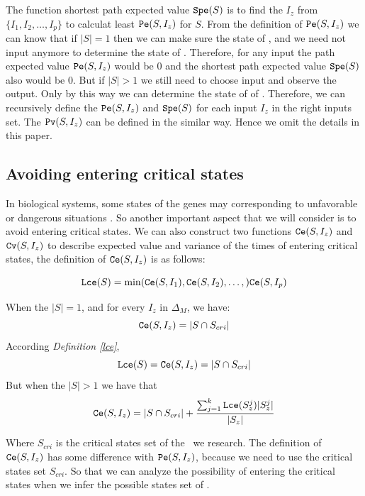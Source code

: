 The function shortest path  expected value ${\tt Spe}(S)$ is to find the $I_z$ from $\{I_1,I_2,\ldots, I_p\}$ to calculat least ${\tt Pe}(S, I_z)$ for $S$. From the definition of ${\tt Pe}(S, I_z)$ we can know that if $|S|=1$ then we can make sure the state of \BCNs, and we need not input anymore to determine the state of \BCNs. Therefore, for any input the path expected value ${\tt Pe}(S, I_z)$ would be $0$ and the shortest path expected value ${\tt Spe}(S)$ also would be $0$. But if $|S|>1$ we still need to choose input and observe the output. Only by this way we can determine the state of of \BCNs. Therefore,  we can recursively define the ${\tt Pe}(S, I_z)$ and ${\tt Spe}(S)$ for each input $I_z$ in the right inputs set.  The ${\tt Pv}(S, I_z)$ can be defined in the similar way. Hence we omit the details in this paper. 

\subsection{Avoiding entering critical states}
In biological systems, some states of the genes may corresponding to unfavorable or dangerous situations \cite{Li2014Controllability}. So another important aspect that we will consider is to avoid entering critical states. We can also construct two functions $\Ce(S, I_z)$ and ${\tt Cv}(S, I_z)$ to describe expected value and variance of the times of entering critical states, the definition of $\Ce(S, I_z)$ is as follows:\\
\begin{definition}[$\Lce(S)$] \label{lce}
\[{\tt Lce}(S)= \min({\tt Ce}(S, I_1),{\tt Ce}(S, I_2),\ldots,){\tt Ce}(S, I_p)\]
\end{definition}
\begin{definition}[$\Ce(S, I_z)$] 
When the $|S|=1$, and for every $I_z$ in $\Delta_M$, we have: \[{\tt Ce}(S, I_z)=|S \cap S_{cri} |\] 
According {\em Definition \ref{lce}}, %
\[{\tt Lce}(S)={\tt Ce}(S, I_z)=|S \cap S_{cri} |\] 
But when the $|S|>1$ 
we have that 
\[{\tt Ce}(S, I_z)=|S \cap S_{cri} | +\frac{\sum_{j=1}^k {\tt Lce}(S_z^j)|S_z^j|}{ |S_z|} \] 
\end{definition}

Where $S_{cri}$ is the critical states set of the \BCN\ we research. The definition of $\Ce(S, I_z)$ has some difference with ${\tt Pe}(S, I_z)$, because we need to use the critical states set $S_{cri}$. So that  we can analyze the possibility of entering the  critical states when we infer the possible states set of \BCNs.

